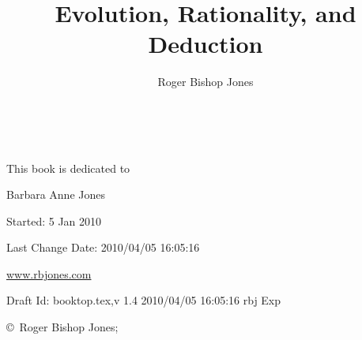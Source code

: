 \documentclass[10pt,titlepage]{book}
\author{Roger Bishop Jones}
\title{Evolution, Rationality, and Deduction}
\date{\ }
\begin{document}
\frontmatter

\begin{titlepage}
\maketitle

\vfill

\begin{centering}

{\parskip=0.3in
This book is dedicated to

{ Barbara Anne Jones}
}

\vfill

{\footnotesize

Started: 5 Jan 2010

Last Change $ $Date: 2010/04/05 16:05:16 $ $

\href{http://www.rbjones.com/}{www.rbjones.com}

Draft $ $Id: booktop.tex,v 1.4 2010/04/05 16:05:16 rbj Exp $ $

\copyright\ Roger Bishop Jones;

}%

\end{centering}

\thispagestyle{empty}
\end{titlepage}

{\parskip=0pt\tableofcontents}
\end{document}
